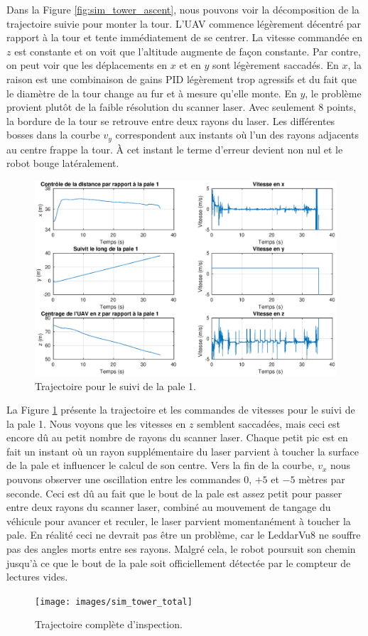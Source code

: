 Dans la Figure \ref{fig:sim_tower_ascent}, nous pouvons voir la décomposition de la trajectoire suivie pour monter la tour. L'UAV commence légèrement décentré par rapport à la tour et tente immédiatement de se centrer. La vitesse commandée en $z$ est constante et on voit que l'altitude augmente de façon constante. Par contre, on peut voir que les déplacements en $x$ et en $y$ sont légèrement saccadés. En $x$, la raison est une combinaison de gains PID légèrement trop agressifs et du fait que le diamètre de la tour change au fur et à mesure qu'elle monte. En $y$, le problème provient plutôt de la faible résolution du scanner laser. Avec seulement $8$ points, la bordure de la tour se retrouve entre deux rayons du laser. Les différentes bosses dans la courbe $v_y$ correspondent aux instants où l'un des rayons adjacents au centre frappe la tour. À cet instant le terme d'erreur devient non nul et le robot bouge latéralement.
\begin{figure}[htb]
  \centering
  \includegraphics[trim=30 20 30 0, clip, width=\linewidth]{images/sim_suivit_pale}
  \caption{Trajectoire pour le suivi de la pale 1.}
  \label{fig:sim_suivit_pale}
\end{figure}

La Figure \ref{fig:sim_suivit_pale} présente la trajectoire et les commandes de vitesses pour le suivi de la pale 1. Nous voyons que les vitesses en $z$ semblent saccadées, mais ceci est encore dû au petit nombre de rayons du scanner laser. Chaque petit pic est en fait un instant où un rayon supplémentaire du laser parvient à toucher la surface de la pale et influencer le calcul de son centre. Vers la fin de la courbe, $v_x$ nous pouvons observer une oscillation entre les commandes $0$, $+5$ et $-5$ mètres par seconde. Ceci est dû au fait que le bout de la pale est assez petit pour passer entre deux rayons du scanner laser, combiné au mouvement de tangage du véhicule pour avancer et reculer, le laser parvient momentanément à toucher la pale. En réalité ceci ne devrait pas être un problème, car le LeddarVu8 ne souffre pas des angles morts entre ses rayons. Malgré cela, le robot poursuit son chemin jusqu'à ce que le bout de la pale soit officiellement détectée par le compteur de lectures vides.
\begin{figure}[htb]
  \centering
  \texttt{[image: images/sim\_tower\_total]}
  \caption{Trajectoire complète d'inspection.}
  \label{fig:sim_tower_total}
\end{figure}

